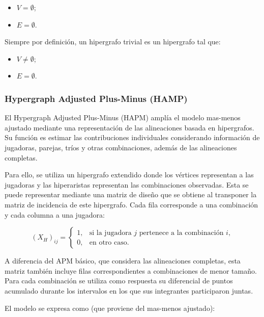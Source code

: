 \begin{itemize}
    \item $V = \emptyset$;
    \item $E = \emptyset$.
\end{itemize}

Siempre por definición, un hipergrafo trivial es un hipergrafo tal que:

\begin{itemize}
    \item $V \neq \emptyset$;
    \item $E = \emptyset$.
\end{itemize}
\cite{bretto2013hypergraph}


\subsubsection{Hypergraph Adjusted Plus-Minus (HAMP)}
El Hypergraph Adjusted Plus-Minus (HAPM) amplía el
modelo mas-menos ajustado mediante una representación de las
alineaciones basada en hipergrafos. Su función es estimar las
contribuciones individuales considerando información de
jugadoras, parejas, tríos y otras combinaciones, además de
las alineaciones completas.
\cite{josephs2025hypergraphadjustedplusminus}

Para ello, se utiliza un hipergrafo extendido donde los
vértices representan a las jugadoras y las hiperaristas
representan las combinaciones observadas. Esta se puede representar mediante una matriz de diseño que
se obtiene al transponer la matriz de incidencia de este
hipergrafo. Cada fila corresponde a una combinación y cada
columna a una jugadora:

\begin{equation}
    (X_H)_{ij} =
    \begin{cases}
        1, & \text{si la jugadora } j
             \text{ pertenece a la combinación } i, \\
        0, & \text{en otro caso}.
    \end{cases}
\end{equation}

A diferencia del APM básico, que considera las alineaciones
completas, esta matriz también incluye filas correspondientes
a combinaciones de menor tamaño. Para cada combinación se
utiliza como respuesta su diferencial de puntos acumulado
durante los intervalos en los que sus integrantes
participaron juntas.

El modelo se expresa como (que proviene del mas-menos ajustado):

